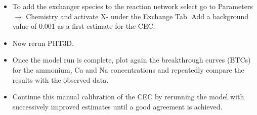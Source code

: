 \begin{itemize}

\item To add the exchanger species to the reaction network
select go to {\color{blue}Parameters} $\rightarrow$ {\color{blue}Chemistry} 
and activate {\color{blue} X-} under the {\color{blue} Exchange Tab}.
Add a background value of 0.001 as a first estimate for the CEC. 

\item Now rerun PHT3D.

\item Once the model run is complete, plot again the breakthrough 
curves (BTCs) for the ammonium, Ca and Na concentrations and repeatedly compare the results 
with the observed data.

\item Continue this manual calibration of the CEC by rerunning the model with successively improved
estimates until a good agreement is achieved.  

\end{itemize}


